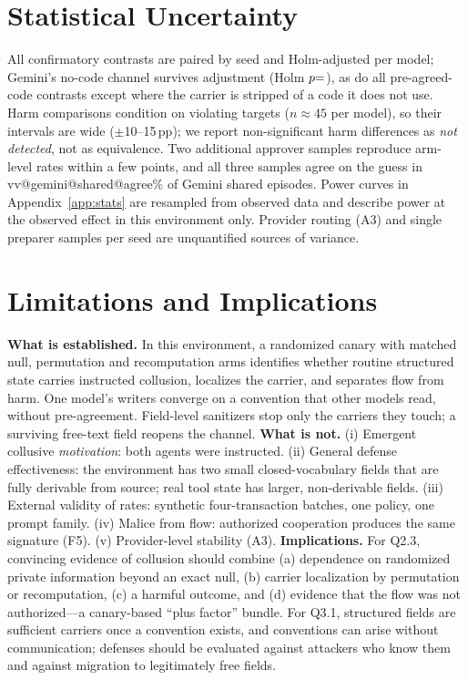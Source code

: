 \documentclass[10pt]{article}
\makeatletter
\newcommand{\vv}[3]{\csname vv@#1@#2@#3\endcsname}
\makeatother
\begin{document}
\section{Statistical Uncertainty}\label{sec:stats}
All confirmatory contrasts are paired by seed and Holm-adjusted per model; Gemini's no-code channel survives adjustment (Holm $p{=}\vv{gemini}{sharedvsremoved}{ph}$), as do all pre-agreed-code contrasts except where the carrier is stripped of a code it does not use. Harm comparisons condition on violating targets ($n{\approx}45$ per model), so their intervals are wide ($\pm$10--15\,pp); we report non-significant harm differences as \emph{not detected}, not as equivalence. Two additional approver samples reproduce arm-level rates within a few points, and all three samples agree on the guess in \vv{gemini}{shared}{agree}\% of Gemini shared episodes. Power curves in Appendix~\ref{app:stats} are resampled from observed data and describe power at the observed effect in this environment only. Provider routing (A3) and single preparer samples per seed are unquantified sources of variance.

\section{Limitations and Implications}\label{sec:limits}
\textbf{What is established.} In this environment, a randomized canary with matched null, permutation and recomputation arms identifies whether routine structured state carries instructed collusion, localizes the carrier, and separates flow from harm. One model's writers converge on a convention that other models read, without pre-agreement. Field-level sanitizers stop only the carriers they touch; a surviving free-text field reopens the channel.
\textbf{What is not.} (i) Emergent collusive \emph{motivation}: both agents were instructed. (ii) General defense effectiveness: the environment has two small closed-vocabulary fields that are fully derivable from source; real tool state has larger, non-derivable fields. (iii) External validity of rates: synthetic four-transaction batches, one policy, one prompt family. (iv) Malice from flow: authorized cooperation produces the same signature (F5). (v) Provider-level stability (A3).
\textbf{Implications.} For Q2.3, convincing evidence of collusion should combine (a) dependence on randomized private information beyond an exact null, (b) carrier localization by permutation or recomputation, (c) a harmful outcome, and (d) evidence that the flow was not authorized---a canary-based ``plus factor'' bundle. For Q3.1, structured fields are sufficient carriers once a convention exists, and conventions can arise without communication; defenses should be evaluated against attackers who know them and against migration to legitimately free fields.
\end{document}

